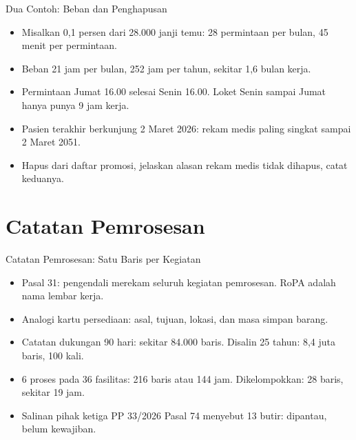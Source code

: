 \documentclass[aspectratio=169, table, 12pt]{beamer}
\begin{document}
\begin{frame}{{\Large Dua Contoh: Beban dan Penghapusan}}
  \vspace{6pt}
  \small
  \begin{itemize}
    \item Misalkan 0,1 persen dari 28.000 janji temu: 28 permintaan per bulan, 45 menit per
          permintaan.
    \item Beban 21 jam per bulan, 252 jam per tahun, sekitar 1,6 bulan kerja.
    \item Permintaan Jumat 16.00 selesai Senin 16.00. Loket Senin sampai Jumat hanya punya 9 jam
          kerja.
    \item Pasien terakhir berkunjung 2 Maret 2026: rekam medis paling singkat sampai 2 Maret 2051.
    \item Hapus dari daftar promosi, jelaskan alasan rekam medis tidak dihapus, catat keduanya.
  \end{itemize}
\end{frame}

\section{Catatan Pemrosesan}

\begin{frame}{{\Large Catatan Pemrosesan: Satu Baris per Kegiatan}}
  \vspace{6pt}
  \small
  \begin{itemize}
    \item Pasal 31: pengendali merekam seluruh kegiatan pemrosesan. RoPA adalah nama lembar kerja.
    \item Analogi kartu persediaan: asal, tujuan, lokasi, dan masa simpan barang.
    \item Catatan dukungan 90 hari: sekitar 84.000 baris. Disalin 25 tahun: 8,4 juta baris,
          100 kali.
    \item 6 proses pada 36 fasilitas: 216 baris atau 144 jam. Dikelompokkan: 28 baris,
          sekitar 19 jam.
    \item Salinan pihak ketiga PP 33/2026 Pasal 74 menyebut 13 butir: dipantau, belum kewajiban.
  \end{itemize}
\end{frame}
\end{document}
